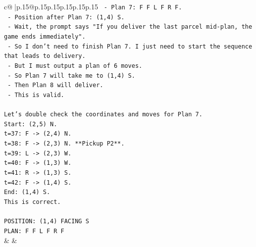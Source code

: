 \documentclass{article}
\begin{document}
{\begin{supertabular}{c@{$\;$}|p{.15\linewidth}@{}p{.15\linewidth}p{.15\linewidth}p{.15\linewidth}p{.15\linewidth}p{.15\linewidth}}
{{{\texttt{      {-} Plan 7: F F L F R F.} \\
\texttt{      {-} Position after Plan 7: (1,4) S.} \\
\texttt{      {-} Wait, the prompt says "If you deliver the last parcel mid{-}plan, the game ends immediately".} \\
\texttt{      {-} So I don't need to finish Plan 7. I just need to start the sequence that leads to delivery.} \\
\texttt{      {-} But I must output a plan of 6 moves.} \\
\texttt{      {-} So Plan 7 will take me to (1,4) S.} \\
\texttt{      {-} Then Plan 8 will deliver.} \\
\texttt{      {-} This is valid.} \\
\\ 
\texttt{Let's double check the coordinates and moves for Plan 7.} \\
\texttt{Start: (2,5) N.} \\
\texttt{t=37: F {-}> (2,4) N.} \\
\texttt{t=38: F {-}> (2,3) N. **Pickup P2**.} \\
\texttt{t=39: L {-}> (2,3) W.} \\
\texttt{t=40: F {-}> (1,3) W.} \\
\texttt{t=41: R {-}> (1,3) S.} \\
\texttt{t=42: F {-}> (1,4) S.} \\
\texttt{End: (1,4) S.} \\
\texttt{This is correct.} \\
\\ 
\texttt{POSITION: (1,4) FACING S} \\
\texttt{PLAN: F F L F R F} \\
            }
        }
    }
    & & \\ \\


\end{supertabular}}
\end{document}
